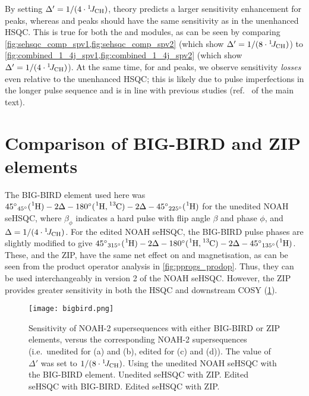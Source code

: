 By setting $\Delta' = 1/(4\cdot\onejch)$, theory predicts a larger sensitivity enhancement for  peaks, whereas  and  peaks should have the same sensitivity as in the unenhanced HSQC.
This is true for both the \noahSpa{} and \noahSpb{} modules, as can be seen by comparing \cref{fig:sehsqc_comp_spv1,fig:sehsqc_comp_spv2} (which show $\Delta' = 1/(8\cdot\onejch)$) to \cref{fig:combined_1_4j_spv1,fig:combined_1_4j_spv2} (which show $\Delta' = 1/(4\cdot\onejch)$).
At the same time, for  and  peaks, we observe sensitivity \textit{losses} even relative to the unenhanced HSQC; this is likely due to pulse imperfections in the longer pulse sequence and is in line with previous studies (ref.\  of the main text).

\section{Comparison of BIG-BIRD and ZIP elements}

The BIG-BIRD element used here was ${45^\circ}_{45^\circ}(\proton{}) - 2\Delta - 180^\circ(\proton{},\carbon{}) - 2\Delta - {45^\circ}_{225^\circ}(\proton{})$ for the unedited NOAH seHSQC, where $\beta_\phi$ indicates a hard pulse with flip angle $\beta$ and phase $\phi$, and $\Delta = 1/(4\cdot\onejch)$.
For the edited NOAH seHSQC, the BIG-BIRD pulse phases are slightly modified to give ${45^\circ}_{315^\circ}(\proton{}) - 2\Delta - 180^\circ(\proton{},\carbon{}) - 2\Delta - {45^\circ}_{135^\circ}(\proton{})$.
These, and the ZIP, have the same net effect on  and  magnetisation, as can be seen from the product operator analysis in \cref{fig:pprogs_prodop}.
Thus, they can be used interchangeably in version 2 of the NOAH seHSQC.
However, the ZIP provides greater sensitivity in both the HSQC and downstream COSY (\cref{fig:bigbird}).

\begin{figure}
    \centering
    \texttt{[image: bigbird.png]}
    {\label{fig:bigbird_unedited_bigbird}}
    {\label{fig:bigbird_unedited_zip}}
    {\label{fig:bigbird_edited_bigbird}}
    {\label{fig:bigbird_edited_zip}}
    \caption{
        Sensitivity of NOAH-2  supersequences with either BIG-BIRD or ZIP elements, versus the corresponding NOAH-2  supersequences (i.e.\ unedited for (a) and (b), edited for (c) and (d)).
        The value of $\Delta'$ was set to $1/(8 \cdot \onejch)$.
        \textbf{} Using the unedited NOAH seHSQC with the BIG-BIRD element.
        \textbf{} Unedited seHSQC with ZIP.
        \textbf{} Edited seHSQC with BIG-BIRD.
        \textbf{} Edited seHSQC with ZIP.
        \andro{}
    }
    \label{fig:bigbird}
\end{figure}


